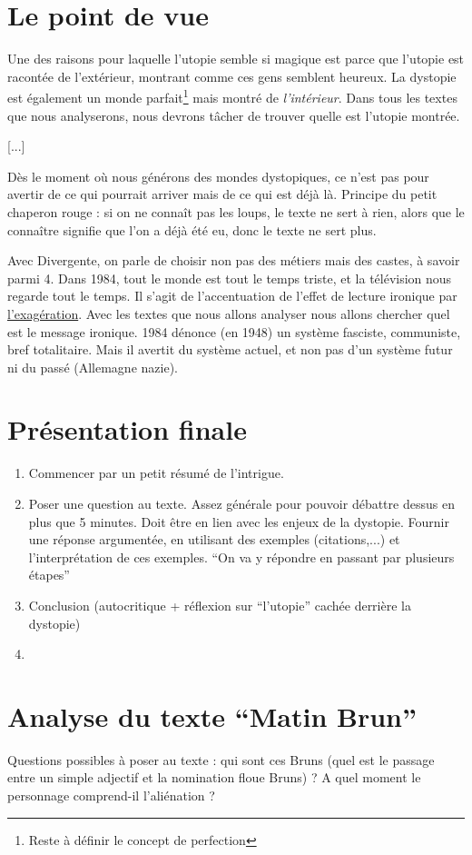 \documentclass[12pt,a4paper]{book}
\begin{document}
\section{Le point de vue}
Une des raisons pour laquelle l'utopie semble si magique est parce que l'utopie est racontée de l'extérieur, montrant comme ces gens semblent heureux. La dystopie est également un monde parfait\footnote{Reste à définir le concept de perfection} mais montré de \textit{l'intérieur}. Dans tous les textes que nous analyserons, nous devrons tâcher de trouver quelle est l'utopie montrée.

[...]

Dès le moment où nous générons des mondes dystopiques, ce n'est pas pour avertir de ce qui pourrait arriver mais de ce qui est déjà là. Principe du petit chaperon rouge : si on ne connaît pas les loups, le texte ne sert à rien, alors que le connaître signifie que l'on a déjà été eu, donc le texte ne sert plus. 

Avec Divergente, on parle de choisir non pas des métiers mais des castes, à savoir parmi 4. Dans 1984, tout le monde est tout le temps triste, et la télévision nous regarde tout le temps. Il s'agit de l'accentuation de l'effet de lecture ironique par \uline{l'exagération}. Avec les textes que nous allons analyser nous allons chercher quel est le message ironique. 1984 dénonce (en 1948) un système fasciste, communiste, bref totalitaire. Mais il avertit du système actuel, et non pas d'un système futur ni du passé (Allemagne nazie). 

\section*{Présentation finale}
\begin{enumerate}
    \item     Commencer par un petit résumé de l'intrigue. 
    \item     Poser une question au texte. Assez générale pour pouvoir débattre dessus en plus que 5 minutes. Doit être en lien avec les enjeux de la dystopie. Fournir une réponse argumentée, en utilisant des exemples (citations,...) et l'interprétation de ces exemples. ``On va y répondre en passant par plusieurs étapes''
    \item     Conclusion (autocritique + réflexion sur ``l'utopie'' cachée derrière la dystopie)
    \item     
\end{enumerate}

\section{Analyse du texte ``Matin Brun''}
Questions possibles à poser au texte : qui sont ces Bruns (quel est le passage entre un simple adjectif et la nomination floue Bruns) ? A quel moment le personnage comprend-il l'aliénation ? 
\end{document}
